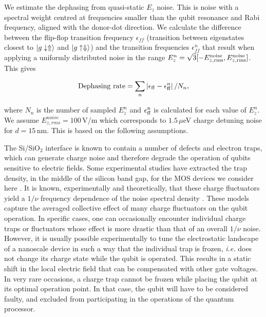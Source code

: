 We estimate the dephasing from quasi-static $E_z$ noise. This is noise with a spectral weight centred at frequencies smaller than the qubit resonance and Rabi frequency, aligned with the donor-dot direction. We calculate the difference between the flip-flop transition frequency $\epsilon_{ff}$ (transition between eigenstates closest to $|g\downarrow\Uparrow\rangle$ and $|g\uparrow\Downarrow\rangle$) and the transition frequencies $\epsilon_{ff}^n$ that result when applying a uniformly distributed noise in the range $E_z^n=\sqrt{3}[-E_{z,\rm rms}^{\rm noise},E_{z,\rm rms}^{\rm noise}]$. This gives

\begin{equation}
{\rm Dephasing~rate}=\sum\limits_{n}{\left|\epsilon_{\rm ff}-\epsilon_{\rm ff}^n\right|/N_n},
\end{equation}

where $N_n$ is the number of sampled $E_z^n$ and $\epsilon_{\rm ff}^n$ is calculated for each value of $E_z^n$. We assume $E_{z, rms}^{noise}=100\,$V/m  which corresponds to $1.5\,\mu$eV charge detuning noise for $d=15\,$nm. This is based on the following assumptions. 

The Si/SiO$_2$ interface is known to contain a number of defects and electron traps, which can generate charge noise and therefore degrade the operation of qubits sensitive to electric fields. Some experimental studies have extracted the trap density, in the middle of the silicon band gap, for the MOS devices we consider here \cite{Johnson2010S}. It is known, experimentally and theoretically, that these charge fluctuators yield a $1/\nu$ frequency dependence of the noise spectral density \cite{Paladino2014S}. These models capture the averaged collective effect of many charge fluctuators on the qubit operation. In specific cases, one can occasionally encounter individual charge traps or fluctuators whose effect is more drastic than that of an overall $1/\nu$ noise. However, it is usually possible experimentally to tune the electrostatic landscape of a nanoscale device in such a way that the individual trap is frozen, \textit{i.e.} does not change its charge state while the qubit is operated. This results in a static shift in the local electric field that can be compensated with other gate voltages. In very rare occasions, a charge trap cannot be frozen while placing the qubit at its optimal operation point. In that case, the qubit will have to be considered faulty, and excluded from participating in the operations of the quantum processor.

